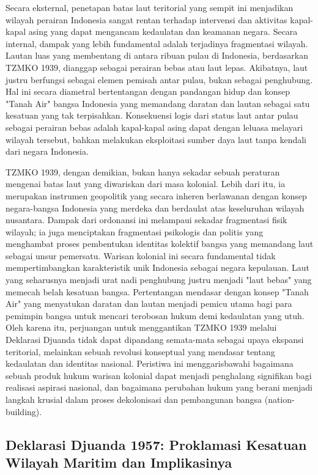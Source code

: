 \documentclass[12pt, a4paper]{article}
\begin{document}
Secara eksternal, penetapan batas laut teritorial yang sempit ini menjadikan wilayah perairan Indonesia sangat rentan terhadap intervensi dan aktivitas kapal-kapal asing yang dapat mengancam kedaulatan dan keamanan negara. Secara internal, dampak yang lebih fundamental adalah terjadinya fragmentasi wilayah. Lautan luas yang membentang di antara ribuan pulau di Indonesia, berdasarkan TZMKO 1939, dianggap sebagai perairan bebas atau laut lepas. Akibatnya, laut justru berfungsi sebagai elemen pemisah antar pulau, bukan sebagai penghubung. Hal ini secara diametral bertentangan dengan pandangan hidup dan konsep "Tanah Air" bangsa Indonesia yang memandang daratan dan lautan sebagai satu kesatuan yang tak terpisahkan. Konsekuensi logis dari status laut antar pulau sebagai perairan bebas adalah kapal-kapal asing dapat dengan leluasa melayari wilayah tersebut, bahkan melakukan eksploitasi sumber daya laut tanpa kendali dari negara Indonesia.  

TZMKO 1939, dengan demikian, bukan hanya sekadar sebuah peraturan mengenai batas laut yang diwariskan dari masa kolonial. Lebih dari itu, ia merupakan instrumen geopolitik yang secara inheren berlawanan dengan konsep negara-bangsa Indonesia yang merdeka dan berdaulat atas keseluruhan wilayah nusantara. Dampak dari ordonansi ini melampaui sekadar fragmentasi fisik wilayah; ia juga menciptakan fragmentasi psikologis dan politis yang menghambat proses pembentukan identitas kolektif bangsa yang memandang laut sebagai unsur pemersatu. Warisan kolonial ini secara fundamental tidak mempertimbangkan karakteristik unik Indonesia sebagai negara kepulauan. Laut yang seharusnya menjadi urat nadi penghubung justru menjadi "laut bebas" yang memecah belah kesatuan bangsa. Pertentangan mendasar dengan konsep "Tanah Air" yang menyatukan daratan dan lautan  menjadi pemicu utama bagi para pemimpin bangsa untuk mencari terobosan hukum demi kedaulatan yang utuh. Oleh karena itu, perjuangan untuk menggantikan TZMKO 1939 melalui Deklarasi Djuanda tidak dapat dipandang semata-mata sebagai upaya ekspansi teritorial, melainkan sebuah revolusi konseptual yang mendasar tentang kedaulatan dan identitas nasional. Peristiwa ini menggarisbawahi bagaimana sebuah produk hukum warisan kolonial dapat menjadi penghalang signifikan bagi realisasi aspirasi nasional, dan bagaimana perubahan hukum yang berani menjadi langkah krusial dalam proses dekolonisasi dan pembangunan bangsa (nation-building).  

\subsection*{Deklarasi Djuanda 1957: Proklamasi Kesatuan Wilayah Maritim dan Implikasinya}
\end{document}
